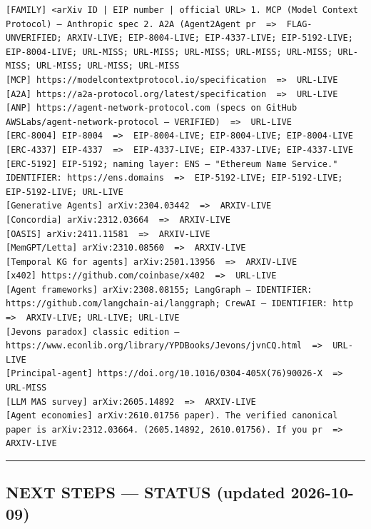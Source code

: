 \documentclass[
]{article}
\begin{document}
\begin{verbatim}
[FAMILY] <arXiv ID | EIP number | official URL> 1. MCP (Model Context Protocol) — Anthropic spec 2. A2A (Agent2Agent pr  =>  FLAG-UNVERIFIED; ARXIV-LIVE; EIP-8004-LIVE; EIP-4337-LIVE; EIP-5192-LIVE; EIP-8004-LIVE; URL-MISS; URL-MISS; URL-MISS; URL-MISS; URL-MISS; URL-MISS; URL-MISS; URL-MISS; URL-MISS
[MCP] https://modelcontextprotocol.io/specification  =>  URL-LIVE
[A2A] https://a2a-protocol.org/latest/specification  =>  URL-LIVE
[ANP] https://agent-network-protocol.com (specs on GitHub AWSLabs/agent-network-protocol — VERIFIED)  =>  URL-LIVE
[ERC-8004] EIP-8004  =>  EIP-8004-LIVE; EIP-8004-LIVE; EIP-8004-LIVE
[ERC-4337] EIP-4337  =>  EIP-4337-LIVE; EIP-4337-LIVE; EIP-4337-LIVE
[ERC-5192] EIP-5192; naming layer: ENS — "Ethereum Name Service." IDENTIFIER: https://ens.domains  =>  EIP-5192-LIVE; EIP-5192-LIVE; EIP-5192-LIVE; URL-LIVE
[Generative Agents] arXiv:2304.03442  =>  ARXIV-LIVE
[Concordia] arXiv:2312.03664  =>  ARXIV-LIVE
[OASIS] arXiv:2411.11581  =>  ARXIV-LIVE
[MemGPT/Letta] arXiv:2310.08560  =>  ARXIV-LIVE
[Temporal KG for agents] arXiv:2501.13956  =>  ARXIV-LIVE
[x402] https://github.com/coinbase/x402  =>  URL-LIVE
[Agent frameworks] arXiv:2308.08155; LangGraph — IDENTIFIER: https://github.com/langchain-ai/langgraph; CrewAI — IDENTIFIER: http  =>  ARXIV-LIVE; URL-LIVE; URL-LIVE
[Jevons paradox] classic edition — https://www.econlib.org/library/YPDBooks/Jevons/jvnCQ.html  =>  URL-LIVE
[Principal-agent] https://doi.org/10.1016/0304-405X(76)90026-X  =>  URL-MISS
[LLM MAS survey] arXiv:2605.14892  =>  ARXIV-LIVE
[Agent economies] arXiv:2610.01756 paper). The verified canonical paper is arXiv:2312.03664. (2605.14892, 2610.01756). If you pr  =>  ARXIV-LIVE
\end{verbatim}

\begin{center}\rule{0.5\linewidth}{0.5pt}\end{center}

\subsection{NEXT STEPS --- STATUS (updated
2026-10-09)}\label{next-steps--status-updated-2026-10-09}
\end{document}
